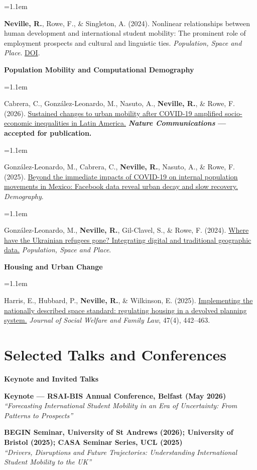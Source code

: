 \documentclass[a4paper,10.5pt]{article}
\newcommand{\subhead}[1]{%
  \vspace{4pt}
  {\small\bfseries #1\par}
  \vspace{1.5pt}
}
\newcommand{\pubitem}[1]{%
  \vspace{2.2pt}
  {\small
    \hangindent=1.1em
    \hangafter=1
    #1\par
  }
}
\newcommand{\talkentry}[2]{%
  \vspace{3pt}
  {\small
    \textbf{#1}\\[-0.5pt]
    \textit{#2}\par
  }
}
\begin{document}
\pubitem{
\textbf{Neville, R.}, Rowe, F., \& Singleton, A. (2024).
Nonlinear relationships between human development and international student mobility:
The prominent role of employment prospects and cultural and linguistic ties.
\textit{Population, Space and Place}.
\href{https://doi.org/10.1002/psp.2764}{DOI}.
}

\subhead{Population Mobility and Computational Demography}

\pubitem{
Cabrera, C., González-Leonardo, M., Nasuto, A., \textbf{Neville, R.},
\& Rowe, F. (2026).
\href{https://doi.org/10.48550/arXiv.2504.15871}{Sustained changes to urban mobility after COVID-19 amplified socio-economic
inequalities in Latin America.}
\textbf{\textit{Nature Communications} --- accepted for publication.}
}

\pubitem{
González-Leonardo, M., Cabrera, C., \textbf{Neville, R.},
Nasuto, A., \& Rowe, F. (2025).
\href{https://doi.org/10.1215/00703370-12183205}{Beyond the immediate impacts of COVID-19 on internal population movements in Mexico:
Facebook data reveal urban decay and slow recovery.}
\textit{Demography}.
}

\pubitem{
González-Leonardo, M., \textbf{Neville, R.},
Gil-Clavel, S., \& Rowe, F. (2024).
\href{https://doi.org/10.1002/psp.2790}{Where have the Ukrainian refugees gone?
Integrating digital and traditional geographic data.}
\textit{Population, Space and Place}.
}

\subhead{Housing and Urban Change}

\pubitem{
Harris, E., Hubbard, P., \textbf{Neville, R.}, \& Wilkinson, E. (2025).
\href{https://doi.org/10.1080/09649069.2025.2569182}{Implementing the nationally described space standard: regulating housing in a devolved planning system.}
\textit{Journal of Social Welfare and Family Law}, 47(4), 442--463.
}

\section{Selected Talks and Conferences}

\subhead{Keynote and Invited Talks}

\talkentry
{Keynote --- RSAI-BIS Annual Conference, Belfast (May 2026)}
{``Forecasting International Student Mobility in an Era of Uncertainty:
From Patterns to Prospects''}

\talkentry
{BEGIN Seminar, University of St Andrews (2026);
University of Bristol (2025); CASA Seminar Series, UCL (2025)}
{``Drivers, Disruptions and Future Trajectories:
Understanding International Student Mobility to the UK''}
\end{document}
